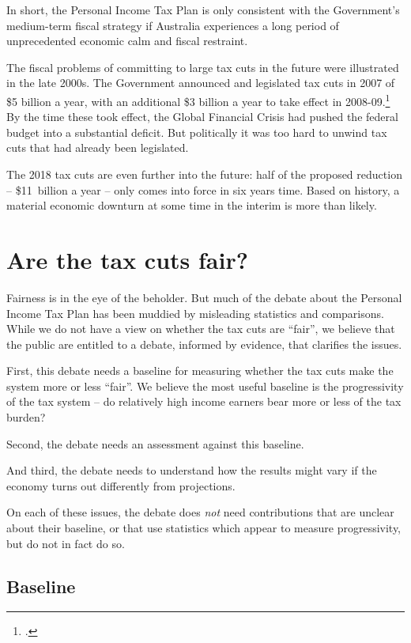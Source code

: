 \documentclass[submission]{grattan}\usepackage[]{graphicx}\usepackage[]{color}
\begin{document}
In short, the Personal Income Tax Plan is only consistent with the Government's medium-term fiscal strategy if Australia experiences a long period of unprecedented economic calm and fiscal restraint.

The fiscal problems of committing to large tax cuts in the future were illustrated in the late 2000s. The Government announced and legislated tax cuts in 2007 of \$5 billion a year, with an additional \$3 billion a year to take effect in 2008-09.\footcite[][3]{Treasury2007}
By the time these took effect, the Global Financial Crisis had pushed the federal budget into a substantial deficit. But politically it was too hard to unwind tax cuts that had already been legislated.

The 2018 tax cuts are even further into the future: half of the proposed reduction -- \$11~billion a year -- only comes into force in six years time. Based on history, a material economic downturn at some time in the interim is more than likely.


\chapter{Are the tax cuts fair?}\label{chap:are-the-tax-cuts-fair}

Fairness is in the eye of the beholder. But much of the debate about the Personal Income Tax Plan has been muddied by misleading statistics and comparisons. While we do not have a view on whether the tax cuts are ``fair'', we believe that the public are entitled to a debate, informed by evidence, that clarifies the issues.

First, this debate needs a baseline for measuring whether the tax cuts make the system more or less ``fair''. We believe the most useful baseline is the progressivity of the tax system -- do relatively high income earners bear more or less of the tax burden?

Second, the debate needs an assessment against this baseline.

And third, the debate needs to understand how the results might vary if the economy turns out differently from projections.

On each of these issues, the debate does \emph{not} need contributions that are unclear about their baseline, or that use statistics which appear to measure progressivity, but do not in fact do so.

\section{Baseline}\label{sec:baseline}
\end{document}
